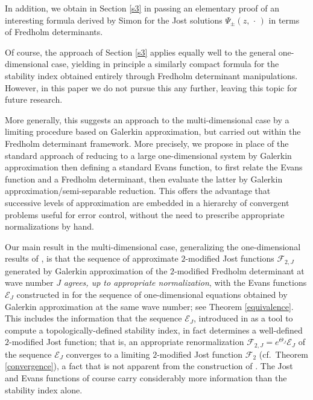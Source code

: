 In addition, we obtain in Section \ref{s3} in passing an elementary proof of
an interesting formula derived by Simon \cite{Si00}
for the Jost solutions $\Psi_\pm(z,{\,\cdot\,})$  in terms of Fredholm determinants.

Of course, the approach of Section \ref{s3}
applies equally well to the general one-dimensional case,
yielding in principle a similarly compact formula for the stability
index obtained entirely through Fredholm determinant manipulations.
However, in this paper we do not pursue this any further, 
leaving this topic for future research.

More generally, this suggests an approach to the multi-dimensional case
by a limiting procedure based on Galerkin approximation, but
carried out within the Fredholm determinant framework.
More precisely, we propose in place of the standard approach of reducing to
a large one-dimensional system by Galerkin approximation then defining
a standard Evans function, to first relate the Evans function and a
Fredholm determinant, then evaluate the latter by Galerkin 
approximation/semi-separable reduction.
This offers the advantage that successive levels of approximation
are embedded in a hierarchy of convergent problems useful for
error control, without the need to prescribe appropriate normalizations
by hand.

Our main result in the multi-dimensional case,
generalizing the one-dimensional results of \cite{GLM07},
is that the sequence of approximate $2$-modified Jost
functions ${{\mathcal F}}_{2,J}$
generated by Galerkin approximation of the $2$-modified
Fredholm determinant
at wave number $J$ {\it agrees, up to appropriate
normalization}, with the Evans functions ${{\mathcal E}}_J$ constructed
in \cite{LPSS00} for the sequence of one-dimensional equations
obtained by Galerkin approximation at the same wave number;
see Theorem \ref{equivalence}.
This includes the information that the sequence ${{\mathcal E}}_J$, 
introduced in \cite{LPSS00} as a tool to compute a topologically-defined
stability index, in fact determines a well-defined
$2$-modified Jost function; that is,
an appropriate renormalization ${{\mathcal F}}_{2,J}= e^{\Theta_J} {{\mathcal E}}_J$
of the sequence ${{\mathcal E}}_J$ converges to a limiting $2$-modified Jost
 function ${{\mathcal F}}_{2}$ (cf.\ Theorem \ref{convergence}),
a fact that is not apparent from the construction of \cite{LPSS00}.
The Jost and Evans functions of course carry considerably more information
than the stability index alone.

